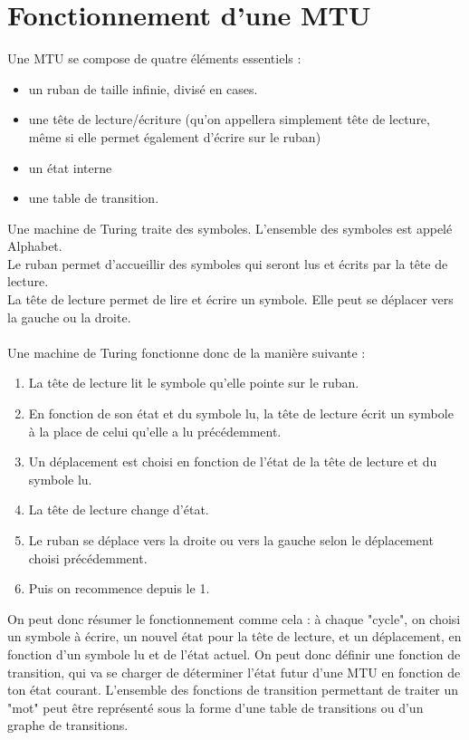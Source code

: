 \documentclass[12pt]{report}
\begin{document}
	\section{Fonctionnement d'une MTU}
	Une MTU se compose de quatre éléments essentiels :
	\begin{itemize}[label=$-$]
		\item un ruban de taille infinie, divisé en cases.
		\item une tête de lecture/écriture (qu'on appellera simplement tête de lecture, même si elle permet également d'écrire sur le ruban)
		\item un état interne
		\item une table de transition.
	\end{itemize}
	Une machine de Turing traite des symboles. L'ensemble des symboles est appelé Alphabet.\\
	Le ruban permet d'accueillir des symboles qui seront lus et écrits par la tête de lecture.\\
	La tête de lecture permet de lire et écrire un symbole. Elle peut se déplacer vers la gauche ou la droite.\\
	\\
	Une machine de Turing fonctionne donc de la manière suivante :
	\begin{enumerate}
		\item La tête de lecture lit le symbole qu'elle pointe sur le ruban.
		\item En fonction de son état et du symbole lu, la tête de lecture écrit un symbole à la place de celui qu'elle a lu précédemment.
		\item Un déplacement est  choisi en fonction de l'état de la tête de lecture et du symbole lu.
		\item La tête de lecture change d'état.
		\item Le ruban se déplace vers la droite ou vers la gauche selon le déplacement choisi précédemment.
		\item Puis on recommence depuis le 1.
	\end{enumerate}
	 On peut donc résumer le fonctionnement comme cela : à chaque "cycle", on choisi un symbole à écrire, un nouvel état pour la tête de lecture, et un déplacement, en fonction d'un symbole lu et de l'état actuel. On peut donc définir une fonction de transition, qui va se charger de déterminer l'état futur d'une MTU en fonction de ton état courant. L'ensemble des fonctions de transition permettant de traiter un "mot" peut être représenté sous la forme d'une table de transitions ou d'un graphe de transitions.\\
\end{document}
